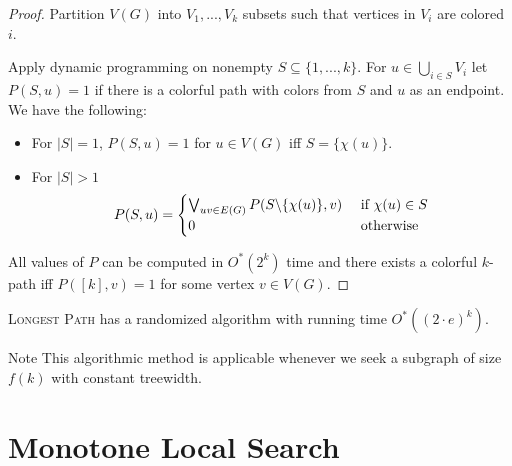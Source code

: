 \begin{frame}[c]
        
        \begin{proof}
        Partition $V(G)$ into $V_1,...,V_k$ subsets such that vertices in $V_i$ are colored $i$. 
        \pause

        Apply dynamic programming on nonempty $S \subseteq \{1,...,k\}$. For $u \in \bigcup_{i \in S} V_i$ let $P(S,u)=1$ if there is a colorful path with colors from $S$ and $u$ as an endpoint.
        \pause
        We have the following:
        \begin{itemize}
            \item For $|S| = 1$, $P(S,u)=1$ for $u \in V(G)$ iff $S = \{\chi(u)\}$.
            \item For $|S| > 1$
            \[P(S,u) = \begin{cases} 
                \bigvee_{uv \in E(G)} P(S \backslash \{\chi(u)\}, v) & \text{ if } \chi(u) \in S \\
                0 & \text{ otherwise} 
            \end{cases}
            \]
        \end{itemize}
        \pause
        All values of $P$ can be computed in $O^*(2^k)$ time and there exists a colorful $k$-path iff $P([k],v)=1$ for some vertex $v \in V(G)$.
        \end{proof}
\end{frame}


\begin{frame}[c]
    
    \begin{theorem}
    	\textsc{Longest Path} has a randomized algorithm with running time $O^*((2\cdot e)^k)$.
    \end{theorem}

	\noindent
\begin{block}{Note}
	This algorithmic method is applicable whenever we seek a subgraph of size $f(k)$ with constant treewidth.
\end{block}

\end{frame}



\section{Monotone Local Search}

